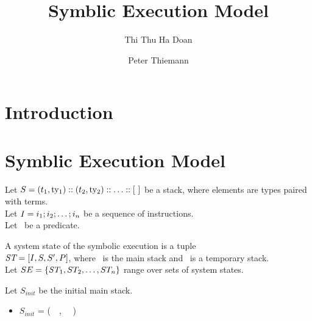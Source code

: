 \documentclass[runningheads]{llncs}
\newcommand\pt{\todo[author=PT,inline]}
\begin{document}
%
\title{Symblic Execution Model}
%
%
\author{Thi Thu Ha Doan\and
  Peter Thiemann}

%
%
%
\maketitle              %
%
\begin{abstract}
 

\keywords{}
\end{abstract}

%
%
%
\section{Introduction}
\label{sec:introduction}

\section{Symblic Execution Model}
\label{sec:symblic-execution-model}

Let $\STACK = (\TermOne, \TYF) \STACKCONCAT (\TermTwo, \TYS) \STACKCONCAT \DOT
\STACKCONCAT \EMPTYSTACK$ be a stack, where elements are types paired with terms.
\\
Let $I = i_1; i_2; \dots; i_n$ be a sequence of instructions. 
\\
Let \PREDICATE\ be a predicate. 

\begin{definition}
A system state of the symbolic execution is a tuple \\ $\textit{ST} = [I, S, S', P]$, where \STACK\ is the main stack and \TSTACK\ is a temporary stack. \\ Let $\text{$SE$} = \{\textit{ST}_1, \text{$ST_2$}, \dots, \text{$ST_n$} \}$ range over sets of system states.
\end{definition}

Let $S_{init}$  be the initial main stack.
\begin{itemize}
\item[]  $S_{init}$ = (\KPAIR\ \VPAR\ \VSTORAGE, \TPAIR\ \TYF\ \TYS) \STACKCONCAT\ \EMPTYSTACK
\end{itemize}
\end{document}
